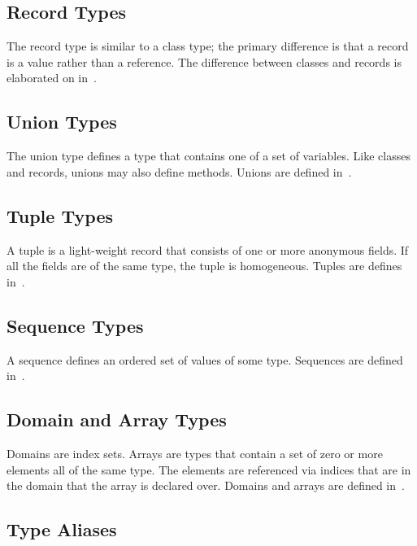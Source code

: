 \subsection{Record Types}
\label{Record_Types}

The record type is similar to a class type; the primary difference is
that a record is a value rather than a reference.  The difference
between classes and records is elaborated on in~.

\subsection{Union Types}
\label{Union_Types}

The union type defines a type that contains one of a set of variables.
Like classes and records, unions may also define methods.  Unions are
defined in~.

\subsection{Tuple Types}
\label{Tuple_Types}

A tuple is a light-weight record that consists of one or more
anonymous fields.  If all the fields are of the same type, the tuple
is homogeneous.  Tuples are defines in~.

\subsection{Sequence Types}
\label{Sequence_Types}

A sequence defines an ordered set of values of some type.  Sequences
are defined in~.

\subsection{Domain and Array Types}
\label{Domain_and_Array_Types}

Domains are index sets.  Arrays are types that contain a set of zero
or more elements all of the same type.  The elements are referenced
via indices that are in the domain that the array is declared over.
Domains and arrays are defined in~.

\subsection{Type Aliases}
\label{Type_Aliases}

